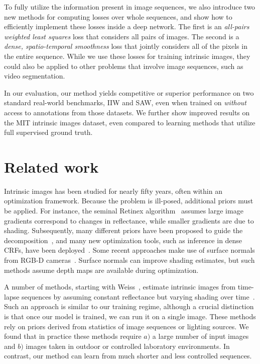 \documentclass[10pt,twocolumn,letterpaper]{article}
\begin{document}
To fully utilize the information present in image sequences, we also
introduce two new methods for computing losses over whole sequences,
and show how to efficiently implement these losses inside a deep
network.  The first is an {\em all-pairs weighted least squares} loss
that considers all pairs of images.  The second is a {\em dense,
  spatio-temporal smoothness} loss that jointly considers all of the
pixels in the entire sequence. While we use these losses for training
intrinsic images, they could also be applied to other problems that
involve image sequences, such as video segmentation.

In our evaluation, our method yields competitive or superior
performance on two standard real-world benchmarks, IIW and SAW, even
when trained on \BTShort\emph{without} access to annotations from
those datasets. We further show improved results on the MIT intrinsic
images dataset, even compared to learning methods that utilize full
supervised ground truth.


\section{Related work}\label{sec:related}  Intrinsic
images has been studied for nearly fifty years,
often within an optimization framework.
Because the problem is ill-posed, additional priors must be applied.
For instance, the seminal Retinex algorithm~\cite{land1971lightness}
assumes large image gradients correspond to changes in reflectance,
while smaller gradients are due to shading.
Subsequently, many different priors have been proposed to guide the
decomposition~\cite{shen2008intrinsic, zhao2012closed,
  rother2011recovering,shen2011intrinsic,garces2012intrinsic}, and
many new optimization tools, such as inference in dense CRFs, have
been deployed~\cite{bell2014intrinsic}.
Some recent approaches make use of surface normals from RGB-D
cameras~\cite{chen2013simple,barron2013intrinsic,jeon2014intrinsic}.
Surface normals can improve shading estimates, but such methods assume
depth maps are available during optimization.

\smallskip{}
A number of methods, starting with Weiss~\cite{weiss2001deriving},
estimate intrinsic images from time-lapse sequences by
assuming constant reflectance but varying shading over time~\cite{matsushita2004estimating,sunkavalli2007factored,hauagge2013photometric,laffont2012coherent,laffont2015intrinsic}.
Such an approach is similar to our training regime, although a crucial
distinction is that once our model is trained, we can run it on a
single image. These methods rely on priors derived from statistics of
image sequences or lighting sources.
We found that in practice these methods require $a)$ a large number of
input images and $b)$ images taken in outdoor or
controlled laboratory environments. In contrast, our method can learn
from much shorter and less controlled sequences.
\end{document}

